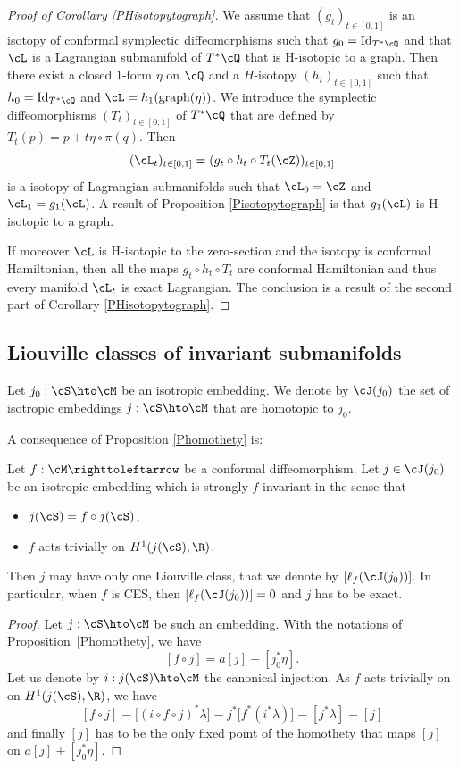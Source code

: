 \begin{proof}[Proof of Corollary \ref{PHisotopytograph}]
We assume that $(g_t)_{t\in[0, 1]}$ is an isotopy of conformal symplectic diffeomorphisms such that $g_0={\rm Id}_{T^*\cQ}$ and that $\cL$ is a Lagrangian submanifold of $T^*\cQ$ that is H-isotopic to a graph. Then there exist a closed $1$-form $\eta$ on $\cQ$ and a $H$-isotopy $(h_t)_{t\in[0,1]}$ such that $h_0={\rm Id}_{T^*\cQ}$ and $\cL=h_1({\rm graph}(\eta))$. We introduce the symplectic diffeomorphisms $(T_t)_{t\in[0, 1]}$ of $T^*\cQ$ that are defined by $T_t(p)=p+t\eta\circ \pi(q)$. Then
\[
(\cL_t)_{t\in[0,1]}=(g_t\circ h_t\circ T_t(\cZ))_{t\in[0,1]}
\]
is a isotopy of Lagrangian submanifolds such that $\cL_0=\cZ$ and $\cL_1=g_1(\cL)$. A result of Proposition \ref{Pisotopytograph} is that $g_1(\cL)$ is H-isotopic to a graph.

If moreover $\cL$ is H-isotopic to the zero-section and the isotopy is conformal Hamiltonian, then all the maps $g_t\circ h_t\circ T_t$ are conformal Hamiltonian and thus every manifold $\cL_t$ is exact Lagrangian. The conclusion is a result of the second part of Corollary \ref{PHisotopytograph}.
\end{proof}

\subsection{Liouville classes of invariant submanifolds}

Let $ j_0:\cS\hto\cM$ be an isotropic embedding. We denote by $\cJ(j_0)$ the set of isotropic embeddings $ j:\cS\hto\cM$ that are homotopic to $j_0$.

A consequence of Proposition \ref{Phomothety} is:
\begin{proposition}\label{Puniqueclass}
Let $f: \cM \righttoleftarrow$ be a conformal diffeomorphism. Let $j\in\cJ(j_0)$ be an isotropic embedding which is strongly $f$-invariant in the sense that
\begin{itemize}
\item
$j(\cS)=f\circ j(\cS)$,
\item
$f$ acts trivially on $H^1(j(\cS),\R)$.
\end{itemize}
Then $j$ may have only one Liouville class, that we denote by $[\ell_f(\cJ(j_0))]$.
In particular, when $f$ is CES, then $[\ell_f(\cJ(j_0))]=0$ and $j$ has to be exact.
\end{proposition}

\begin{proof}
Let $ j:\cS\hto\cM$ be such an embedding. With the notations of Proposition~\ref{Phomothety}, we have
\[
[f\circ j]=a[j]+[j_0^*\eta].
\]
Let us denote by $i:j(\cS)\hto\cM$ the canonical injection. As $f$ acts trivially on on $H^1(j(\cS),\R)$, we have
\[
[f\circ j]=\big[(i\circ f\circ j)^*\lambda\big]=j^*\big[f^*(i^*\lambda)\big]=[j^*\lambda]=[j]
\]
and finally $[j]$ has to be the only fixed point of the homothety that maps $[j]$ on $a[j]+[j_0^*\eta]$.
\end{proof}

